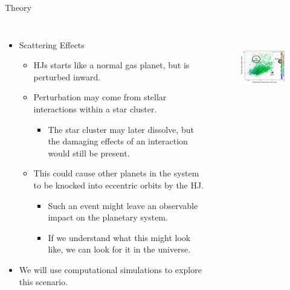 \documentclass{beamer}
\begin{document}
\begin{frame}{Theory}
    \begin{columns}
        \begin{itemize}
            \item Scattering Effects
                \begin{itemize}
                    \item HJs starts like a normal gas planet, but is perturbed inward.
                    \item Perturbation may come from stellar interactions
                        within a star cluster.
                        \begin{itemize}
                            \item The star cluster may later dissolve, but the
                                damaging effects of an interaction would still be present.
                        \end{itemize}
                    \item This could cause other planets in the system to be
                        knocked into eccentric orbits by the HJ.
                        \begin{itemize}
                            \item Such an event might leave an observable impact on the 
                                planetary system.
                            \item If we understand what this might look like,
                                we can look for it in the universe.
                        \end{itemize}
                \end{itemize}
            \item We will use computational simulations to explore this scenario.
        \end{itemize}
            \begin{figure}
                \centering
                \includegraphics[height=1.25in]{hot_jupiter_measure_plot}
            \end{figure}
    \end{columns}
\end{frame}
\end{document}
